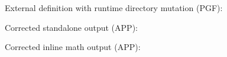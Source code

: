 \documentclass{article}
\begin{document}

\noindent External definition with runtime directory mutation (PGF):\par
{}
\par\bigskip\noindent Corrected standalone output (APP):\par

\par\bigskip\noindent Corrected inline math output (APP):\par
\[

\]
\end{document}
